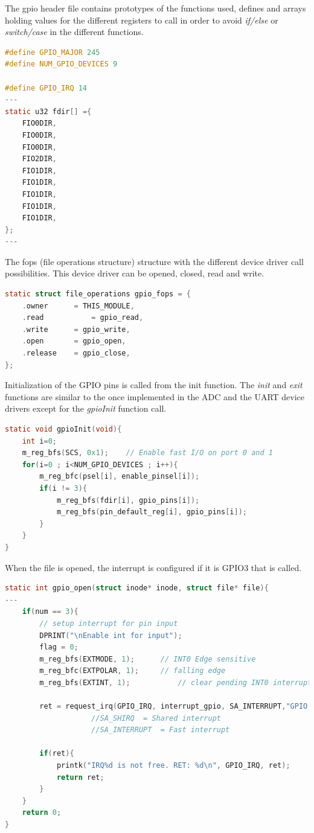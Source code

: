 The gpio header file contains prototypes of the functions used, defines and arrays holding values for the different registers to call in order to avoid \textit{if/else} or \textit{switch/case} in the different functions. 
\begin{lstlisting}[language=c, caption=GPIO header file ]
#define GPIO_MAJOR 245
#define NUM_GPIO_DEVICES 9

#define GPIO_IRQ 14
---
static u32 fdir[] ={
	FIO0DIR,
	FIO0DIR,
	FIO0DIR,
	FIO2DIR,
	FIO1DIR,
	FIO1DIR,
	FIO1DIR,
	FIO1DIR,
	FIO1DIR,
};
---
\end{lstlisting}
The fops (file operations structure) structure with the different device driver call possibilities. This device driver can be opened, closed, read and write.
\begin{lstlisting}[language=c, caption=GPIO fops structure]
static struct file_operations gpio_fops = {
	.owner   	= THIS_MODULE,
	.read			= gpio_read,
	.write  	= gpio_write,
	.open    	= gpio_open,
	.release	= gpio_close,
};
\end{lstlisting}
Initialization of the GPIO pins is called from the init function. The \textit{init} and \textit{exit} functions are similar to the once implemented in the ADC and the UART device drivers except for the \textit{gpioInit} function call.
\begin{lstlisting}[language=c, caption=GPIO init function]
static void gpioInit(void){
	int i=0;
	m_reg_bfs(SCS, 0x1);	// Enable fast I/O on port 0 and 1
	for(i=0 ; i<NUM_GPIO_DEVICES ; i++){
		m_reg_bfc(psel[i], enable_pinsel[i]);
		if(i != 3){
			m_reg_bfs(fdir[i], gpio_pins[i]);
			m_reg_bfs(pin_default_reg[i], gpio_pins[i]);
		}
	}
}
\end{lstlisting}
When the file is opened, the interrupt is configured if it is GPIO3 that is called.
\begin{lstlisting}[language=c, caption=GPIO open function]
static int gpio_open(struct inode* inode, struct file* file){
---
	if(num == 3){
		// setup interrupt for pin input
		DPRINT("\nEnable int for input");
		flag = 0;
		m_reg_bfs(EXTMODE, 1);		// INT0 Edge sensitive
		m_reg_bfc(EXTPOLAR, 1);		// falling edge 
		m_reg_bfs(EXTINT, 1);			// clear pending INT0 interrupts

		ret = request_irq(GPIO_IRQ, interrupt_gpio, SA_INTERRUPT,"GPIO P2.10 interrupt", NULL);
					//SA_SHIRQ 	= Shared interrupt
					//SA_INTERRUPT 	= Fast interrupt

		if(ret){
			printk("IRQ%d is not free. RET: %d\n", GPIO_IRQ, ret);		
			return ret;
		}
	}
	return 0;
}
\end{lstlisting}
